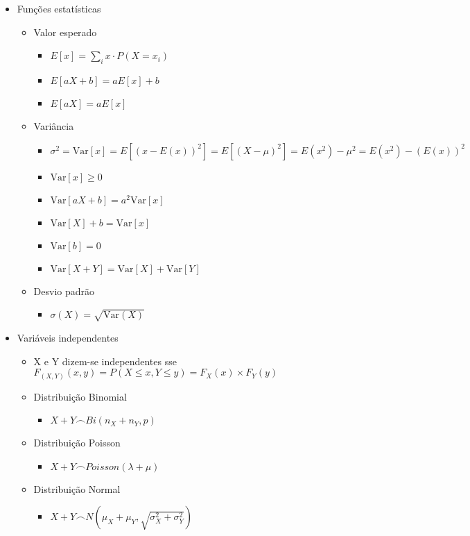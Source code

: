 \documentclass{article}
\begin{document}
\begin{multicols*}{2}
\begin{itemize}
    \item{Funções estatísticas}
    \begin{itemize}
        \item Valor esperado
        \begin{itemize}
            \item $E[x] = \sum\limits_{i} x \cdot P(X=x_i)$
            \item $E[aX + b] = aE[x] + b$
            \item $E[aX] = aE[x]$
        \end{itemize}
        \item Variância
        \begin{itemize}
            \item $\sigma^2 = \text{Var}[x] = E[(x-E(x))^2] = E[(X-\mu)^2] = E(x^2) - \mu^2 = E(x^2) - (E(x))^2 $
            \item $ \text{Var}[x] \geq 0 $
            \item $\text{Var}[aX + b] = a^2\text{Var}[x] $
            \item $\text{Var}[X] + b = \text{Var}[x] $
            \item $\text{Var}[b] = 0 $
            \item $\text{Var}[X + Y] = \text{Var}[X] + \text{Var}[Y]$
        \end{itemize}
        \item Desvio padrão
        \begin{itemize}
            \item $\sigma (X) = \sqrt{\text{Var}(X)}$
        \end{itemize}
    \end{itemize}

    \item{Variáveis independentes}
    \begin{itemize}
        \item X e Y dizem-se independentes sse $F_{(X,Y)}(x,y)=P(X\leq x, Y\leq y)=F_X(x)\times F_Y(y)$
        \item Distribuição Binomial
        \begin{itemize}
            \item $X+Y\frown Bi(n_X+n_Y, p)$
        \end{itemize}
        \item Distribuição Poisson
        \begin{itemize}
            \item $X+Y\frown Poisson(\lambda + \mu)$
        \end{itemize}
        \item Distribuição Normal
        \begin{itemize}
            \item $X+Y\frown N(\mu_X+\mu_Y, \sqrt{\sigma_X^2+\sigma_Y^2})$
        \end{itemize}
    \end{itemize}


\end{itemize}
\end{multicols*}
\end{document}
